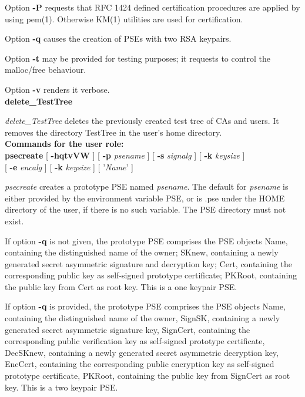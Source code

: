Option {\bf -P} requests that RFC 1424 defined certification procedures are applied
by using pem(1). Otherwise KM(1) utilities are used for certification.

Option {\bf -q} causes the creation of PSEs with two RSA keypairs.

Option {\bf -t} may be provided for testing purposes; it requests to control the malloc/free behaviour.

Option {\bf -v} renders it verbose. \\ [1em]
{\bf delete\_TestTree}

{\em delete\_TestTree} deletes the previously created test tree of CAs and users. It removes
the directory TestTree in the user's home directory.
\\ [1em] 
{\bf Commands for the user role:} 
\\ [1em]
{\bf psecreate} [ {\bf -hqtvVW} ] [ {\bf -p} {\em psename} ]
[ {\bf -s} {\em signalg} ] [ {\bf -k} {\em keysize} ] \\ 
\hspace*{2cm} [ {\bf -e} {\em encalg} ] [ {\bf -k} {\em keysize} ] [ '{\em Name}' ]

{\em psecreate} creates a prototype PSE named {\em psename}. The default for {\em psename} is either
provided by the environment variable PSE, or is .pse under the HOME directory of the user, if there
is no such variable. The PSE directory must not exist.

If option {\bf -q} is not given, the prototype PSE comprises the PSE objects 
\bi
\m Name, containing the distinguished name of the owner;
\m SKnew, containing a newly generated secret asymmetric signature and decryption key;
\m Cert, containing the corresponding public key as self-signed prototype certificate;
\m PKRoot, containing the public key from Cert as root key.
\ei
This is a one keypair PSE.
 
If option {\bf -q} is provided, the prototype PSE comprises the PSE objects 
\bi
\m Name, containing the distinguished name of the owner,
\m SignSK, containing a newly generated secret asymmetric signature key,
\m SignCert, containing the corresponding public verification key as self-signed prototype certificate,
\m DecSKnew, containing a newly generated secret asymmetric decryption key,
\m EncCert, containing the corresponding public encryption key as self-signed prototype certificate,
\m PKRoot, containing the public key from SignCert as root key.
\ei
This is a two keypair PSE.

